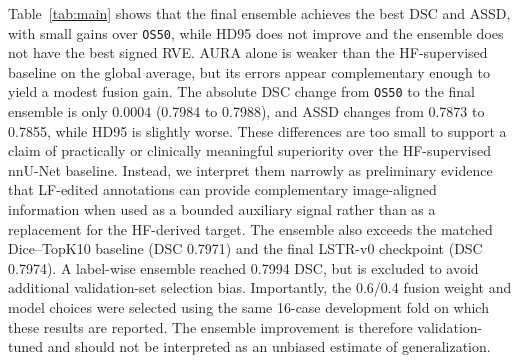 \documentclass[runningheads]{llncs}
\newcommand{\osfifty}{\texttt{OS50}}
\begin{document}
Table~\ref{tab:main} shows that the final ensemble achieves the best DSC and ASSD, with small gains over \osfifty{}, while HD95 does not improve and the ensemble does not have the best signed RVE. AURA alone is weaker than the HF-supervised baseline on the global average, but its errors appear complementary enough to yield a modest fusion gain. The absolute DSC change from \osfifty{} to the final ensemble is only $0.0004$ (0.7984 to 0.7988), and ASSD changes from 0.7873 to 0.7855, while HD95 is slightly worse. These differences are too small to support a claim of practically or clinically meaningful superiority over the HF-supervised nnU-Net baseline. Instead, we interpret them narrowly as preliminary evidence that LF-edited annotations can provide complementary image-aligned information when used as a bounded auxiliary signal rather than as a replacement for the HF-derived target. The ensemble also exceeds the matched Dice--TopK10 baseline (DSC 0.7971) and the final LSTR-v0 checkpoint (DSC 0.7974). A label-wise ensemble reached 0.7994 DSC, but is excluded to avoid additional validation-set selection bias. Importantly, the 0.6/0.4 fusion weight and model choices were selected using the same 16-case development fold on which these results are reported. The ensemble improvement is therefore validation-tuned and should not be interpreted as an unbiased estimate of generalization.







\end{document}
